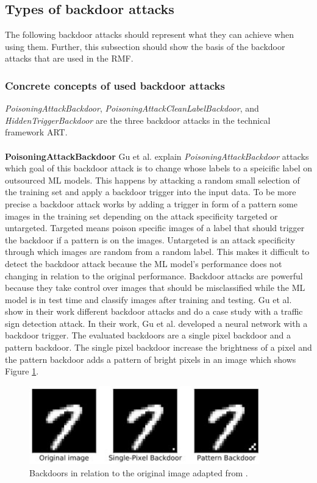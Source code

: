 \subsection{Types of backdoor attacks}
\label{sec:backdoor_types}

The following backdoor attacks should represent what they can achieve when using them. Further, this subsection should show the basis of the backdoor attacks that are used in the RMF.

\subsubsection*{Concrete concepts of used backdoor attacks}

\textit{PoisoningAttackBackdoor}, \textit{PoisoningAttackCleanLabelBackdoor}, and \textit{HiddenTriggerBackdoor} are the three backdoor attacks in the technical framework ART. \\ \\
\textbf{PoisoningAttackBackdoor} Gu et al. \cite{DBLP:journals/corr/abs-1708-06733} explain \textit{PoisoningAttackBackdoor} attacks which goal of this backdoor attack is to change whose labels to a speicific label on outsourced ML models. This happens by attacking a random small selection of the training set and apply a backdoor trigger into the input data. To be more precise a backdoor attack works by adding a trigger in form of a pattern some images in the training set depending on the attack specificity targeted or untargeted. Targeted means poison specific images of a label that should trigger the backdoor if a pattern is on the images. Untargeted is an attack specificity through which images are random from a random label. This makes it difficult to detect the backdoor attack because the ML model's performance does not changing in relation to the original performance. Backdoor attacks are powerful because they take control over images that should be misclassified while the ML model is in test time \cite{turner2018clean} and classify images after training and testing. Gu et al. show in their work different backdoor attacks and do a case study with a traffic sign detection attack. In their work, Gu et al. developed a neural network with a backdoor trigger. The evaluated backdoors are a single pixel backdoor and a pattern backdoor. The single pixel backdoor increase the brightness of a pixel and the pattern backdoor adds a pattern of bright pixels in an image which shows Figure \ref{fig:backdoor_pattern}.

\begin{figure}[ht!]
  \centering
  \includegraphics[width=10cm]{pictures/backdoor_pattern_bad_net.jpg}
  \caption{Backdoors in relation to the original image adapted from \cite{DBLP:journals/corr/abs-1708-06733}.}
  \label{fig:backdoor_pattern}
\end{figure}

